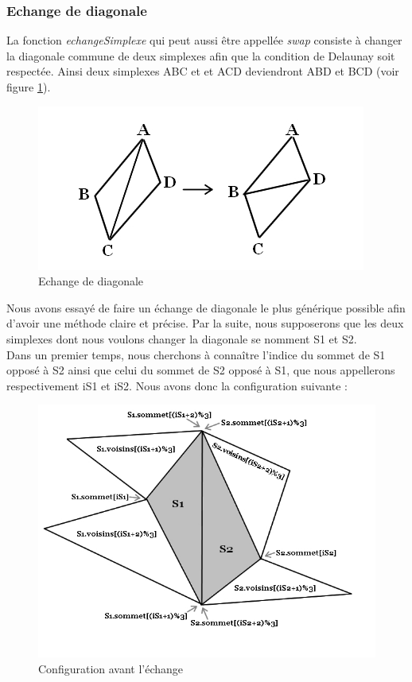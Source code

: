 \documentclass{article}
\begin{document}
       \subsubsection{Echange de diagonale}
       \label{echangeDiagonale}
        La fonction \textit{echangeSimplexe} qui peut aussi être appellée \textit{swap} consiste à changer la diagonale commune de deux simplexes afin que la condition de Delaunay soit respectée. Ainsi deux simplexes ABC et et ACD deviendront ABD et BCD (voir figure \ref{fig1}).
        
        \begin{figure}[H]
    		\centering
    		\includegraphics[scale=0.40]{exemple_swap_simple.jpg}     
    		\caption{Echange de diagonale}
    		\label{fig1}
	    \end{figure}
        
        Nous avons essayé de faire un échange de diagonale le plus générique possible afin d'avoir une méthode claire et précise. Par la suite, nous supposerons que les deux simplexes dont nous voulons changer la diagonale se nomment S1 et S2.
        \\ Dans un premier temps, nous cherchons à connaître l'indice du sommet de S1 opposé à S2 ainsi que celui du sommet de S2 opposé à S1, que nous appellerons respectivement iS1 et iS2. Nous avons donc la configuration suivante : 
        
        \begin{figure}[H]
    		\centering
    		\includegraphics[scale=0.40]{config_avant_swap.jpg}     
    		\caption{Configuration avant l'échange}
	    \end{figure}
	    
\end{document}
